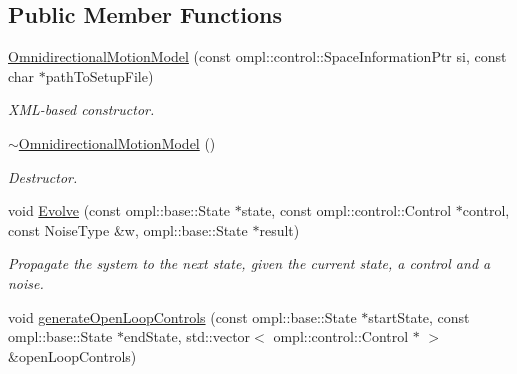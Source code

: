 \subsection*{Public Member Functions}
\begin{DoxyCompactItemize}
\item 
\hypertarget{class_omnidirectional_motion_model_ad730019f72236afd4636b2dcbb8652b6}{\hyperlink{class_omnidirectional_motion_model_ad730019f72236afd4636b2dcbb8652b6}{Omnidirectional\-Motion\-Model} (const ompl\-::control\-::\-Space\-Information\-Ptr si, const char $\ast$path\-To\-Setup\-File)}\label{class_omnidirectional_motion_model_ad730019f72236afd4636b2dcbb8652b6}

\begin{DoxyCompactList}\small\item\em X\-M\-L-\/based constructor. \end{DoxyCompactList}\item 
\hypertarget{class_omnidirectional_motion_model_a3e10df6c966a09dc362495d19f01d474}{\hyperlink{class_omnidirectional_motion_model_a3e10df6c966a09dc362495d19f01d474}{$\sim$\-Omnidirectional\-Motion\-Model} ()}\label{class_omnidirectional_motion_model_a3e10df6c966a09dc362495d19f01d474}

\begin{DoxyCompactList}\small\item\em Destructor. \end{DoxyCompactList}\item 
\hypertarget{class_omnidirectional_motion_model_a8c04ef507e594752501ba37b068000d8}{void \hyperlink{class_omnidirectional_motion_model_a8c04ef507e594752501ba37b068000d8}{Evolve} (const ompl\-::base\-::\-State $\ast$state, const ompl\-::control\-::\-Control $\ast$control, const Noise\-Type \&w, ompl\-::base\-::\-State $\ast$result)}\label{class_omnidirectional_motion_model_a8c04ef507e594752501ba37b068000d8}

\begin{DoxyCompactList}\small\item\em Propagate the system to the next state, given the current state, a control and a noise. \end{DoxyCompactList}\item 
\hypertarget{class_omnidirectional_motion_model_ae1078c0af214ccf7395b2186893da9f2}{void \hyperlink{class_omnidirectional_motion_model_ae1078c0af214ccf7395b2186893da9f2}{generate\-Open\-Loop\-Controls} (const ompl\-::base\-::\-State $\ast$start\-State, const ompl\-::base\-::\-State $\ast$end\-State, std\-::vector$<$ ompl\-::control\-::\-Control $\ast$ $>$ \&open\-Loop\-Controls)}\label{class_omnidirectional_motion_model_ae1078c0af214ccf7395b2186893da9f2}


\end{DoxyCompactItemize}
